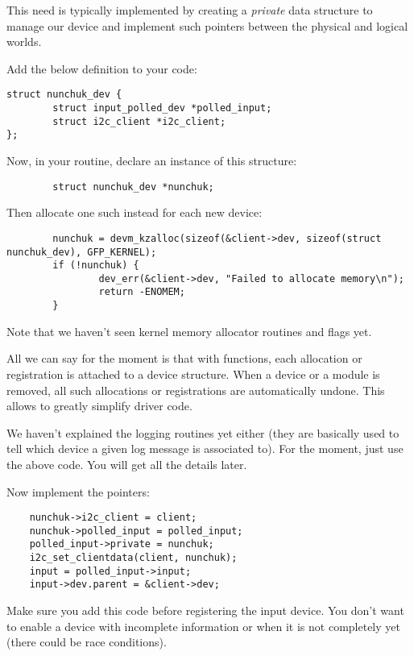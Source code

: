 This need is typically implemented by creating a {\em private} data
structure to manage our device and implement such pointers between
the physical and logical worlds.

Add the below definition to your code:

\begin{verbatim}
struct nunchuk_dev {
        struct input_polled_dev *polled_input;
        struct i2c_client *i2c_client;
};
\end{verbatim}

Now, in your  routine, declare an instance of
this structure:

\begin{verbatim}
        struct nunchuk_dev *nunchuk;
\end{verbatim}

Then allocate one such instead for each new device:

\begin{verbatim}
        nunchuk = devm_kzalloc(sizeof(&client->dev, sizeof(struct nunchuk_dev), GFP_KERNEL);
        if (!nunchuk) {
                dev_err(&client->dev, "Failed to allocate memory\n");
                return -ENOMEM;
        }
\end{verbatim}

Note that we haven't seen kernel memory allocator routines and flags
yet.

All we can say for the moment is that with  functions, 
each allocation or registration
is attached to a device structure. When a device or a module is removed,
all such allocations or registrations are automatically undone. This
allows to greatly simplify driver code.

We haven't explained the  logging routines yet either
(they are basically used to tell which device a given log message is
associated to).  For the moment, just use the above code. You will get
all the details later.

Now implement the pointers: 

\begin{verbatim}
	nunchuk->i2c_client = client;
	nunchuk->polled_input = polled_input;
	polled_input->private = nunchuk;
	i2c_set_clientdata(client, nunchuk);
	input = polled_input->input;
	input->dev.parent = &client->dev;
\end{verbatim}

Make sure you add this code before registering the input device. You
don't want to enable a device with incomplete information or when it is
not completely yet (there could be race conditions). 

